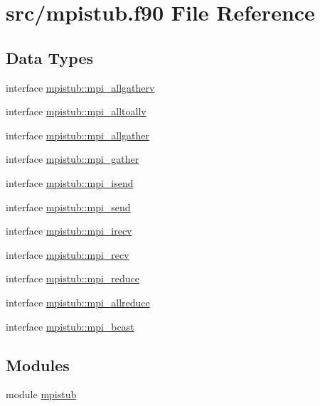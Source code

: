 \hypertarget{mpistub_8f90}{}\section{src/mpistub.f90 File Reference}
\label{mpistub_8f90}
\subsection*{Data Types}
\begin{DoxyCompactItemize}
\item 
interface \mbox{\hyperlink{interfacempistub_1_1mpi__allgatherv}{mpistub\+::mpi\+\_\+allgatherv}}
\item 
interface \mbox{\hyperlink{interfacempistub_1_1mpi__alltoallv}{mpistub\+::mpi\+\_\+alltoallv}}
\item 
interface \mbox{\hyperlink{interfacempistub_1_1mpi__allgather}{mpistub\+::mpi\+\_\+allgather}}
\item 
interface \mbox{\hyperlink{interfacempistub_1_1mpi__gather}{mpistub\+::mpi\+\_\+gather}}
\item 
interface \mbox{\hyperlink{interfacempistub_1_1mpi__isend}{mpistub\+::mpi\+\_\+isend}}
\item 
interface \mbox{\hyperlink{interfacempistub_1_1mpi__send}{mpistub\+::mpi\+\_\+send}}
\item 
interface \mbox{\hyperlink{interfacempistub_1_1mpi__irecv}{mpistub\+::mpi\+\_\+irecv}}
\item 
interface \mbox{\hyperlink{interfacempistub_1_1mpi__recv}{mpistub\+::mpi\+\_\+recv}}
\item 
interface \mbox{\hyperlink{interfacempistub_1_1mpi__reduce}{mpistub\+::mpi\+\_\+reduce}}
\item 
interface \mbox{\hyperlink{interfacempistub_1_1mpi__allreduce}{mpistub\+::mpi\+\_\+allreduce}}
\item 
interface \mbox{\hyperlink{interfacempistub_1_1mpi__bcast}{mpistub\+::mpi\+\_\+bcast}}
\end{DoxyCompactItemize}
\subsection*{Modules}
\begin{DoxyCompactItemize}
\item 
module \mbox{\hyperlink{namespacempistub}{mpistub}}
\end{DoxyCompactItemize}

